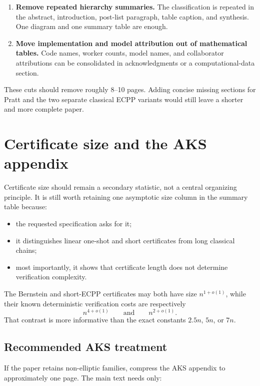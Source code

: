 \documentclass[11pt]{amsart}
\begin{document}
\begin{enumerate}
\item \textbf{Remove repeated hierarchy summaries.}  The classification is repeated in the abstract, introduction, post-list paragraph, table caption, and synthesis.  One diagram and one summary table are enough.

\item \textbf{Move implementation and model attribution out of mathematical tables.}  Code names, worker counts, model names, and collaborator attributions can be consolidated in acknowledgments or a computational-data section.
\end{enumerate}

These cuts should remove roughly 8--10 pages.  Adding concise missing sections for Pratt and the two separate classical ECPP variants would still leave a shorter and more complete paper.

\section{Certificate size and the AKS appendix}

Certificate size should remain a secondary statistic, not a central organizing principle.  It is still worth retaining one asymptotic size column in the summary table because:

\begin{itemize}
\item the requested specification asks for it;
\item it distinguishes linear one-shot and short certificates from long classical chains;
\item most importantly, it shows that certificate length does not determine verification complexity.
\end{itemize}

The Bernstein and short-ECPP certificates may both have size $n^{1+o(1)}$, while their known deterministic verification costs are respectively
\[
 n^{4+o(1)}
 \qquad\text{and}\qquad
 n^{2+o(1)}.
\]
That contrast is more informative than the exact constants $2.5n$, $5n$, or $7n$.

\subsection*{Recommended AKS treatment}

If the paper retains non-elliptic families, compress the AKS appendix to approximately one page.  The main text needs only:
\end{document}
